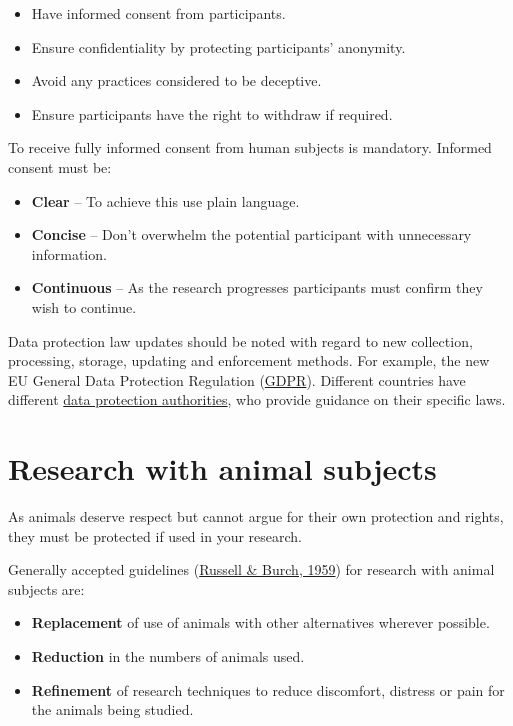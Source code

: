 \documentclass[
]{book}
\begin{document}
\begin{itemize}
\item
  Have informed consent from participants.
\item
  Ensure confidentiality by protecting participants' anonymity.
\item
  Avoid any practices considered to be deceptive.
\item
  Ensure participants have the right to withdraw if required.
\end{itemize}

To receive fully informed consent from human subjects is mandatory. Informed consent must be:

\begin{itemize}
\item
  \textbf{Clear} -- To achieve this use plain language.
\item
  \textbf{Concise} -- Don't overwhelm the potential participant with unnecessary information.
\item
  \textbf{Continuous} -- As the research progresses participants must confirm they wish to continue.
\end{itemize}

Data protection law updates should be noted with regard to new collection, processing, storage, updating and enforcement methods. For example, the new EU General Data Protection Regulation (\href{https://gdpr.eu/what-is-gdpr/}{GDPR}). Different countries have different \href{https://en.wikipedia.org/wiki/National_data_protection_authority}{data protection authorities}, who provide guidance on their specific laws.

\hypertarget{research-with-animal-subjects}{%
\section{Research with animal subjects}\label{research-with-animal-subjects}}

As animals deserve respect but cannot argue for their own protection and rights, they must be protected if used in your research.

Generally accepted guidelines (\href{http://117.239.25.194:7000/jspui/bitstream/123456789/1342/1/PRILIMINERY\%20\%20AND\%20\%20CONTENTS.pdf}{Russell \& Burch, 1959}) for research with animal subjects are:

\begin{itemize}
\item
  \textbf{Replacement} of use of animals with other alternatives wherever possible.
\item
  \textbf{Reduction} in the numbers of animals used.
\item
  \textbf{Refinement} of research techniques to reduce discomfort, distress or pain for the animals being studied.
\end{itemize}
\end{document}
